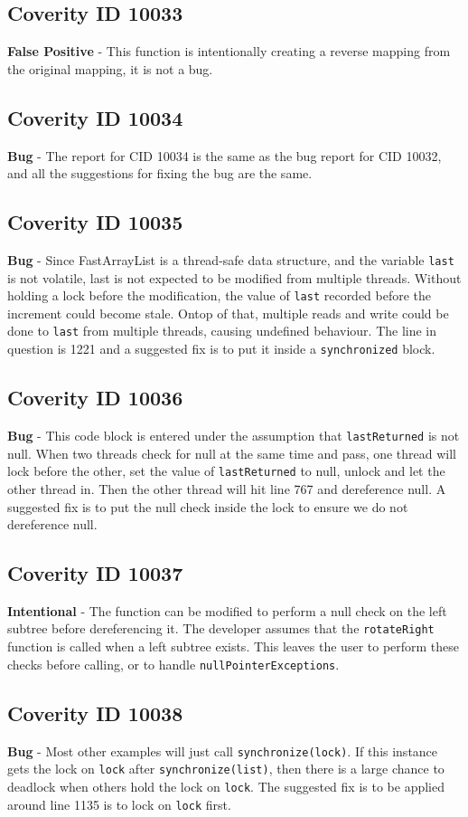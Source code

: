 \documentclass[12pt]{article}
\begin{document}
\subsection{Coverity ID 10033}
\textbf{False Positive} - This function is intentionally creating a reverse mapping from the original mapping, it is not a bug.
\subsection{Coverity ID 10034}
\textbf{Bug} - The report for CID 10034 is the same as the bug report for CID 10032, and all the suggestions for fixing the bug are the same.
\subsection{Coverity ID 10035}
\textbf{Bug} - Since FastArrayList is a thread-safe data structure, and the variable \texttt{last} is not volatile, last is not expected to be modified from multiple threads. Without holding a lock before the modification, the value of \texttt{last} recorded before the increment could become stale. Ontop of that, multiple reads and write could be done to \texttt{last} from multiple threads, causing undefined behaviour. The line in question is 1221 and a suggested fix is to put it inside a \texttt{synchronized} block.
\subsection{Coverity ID 10036}
\textbf{Bug} - This code block is entered under the assumption that \texttt{lastReturned} is not null. When two threads check for null at the same time and pass, one thread will lock before the other, set the value of \texttt{lastReturned} to null, unlock and let the other thread in. Then the other thread will hit line 767 and dereference null. A suggested fix is to put the null check inside the lock to ensure we do not dereference null.
\subsection{Coverity ID 10037}
\textbf{Intentional} - The function can be modified to perform a null check on the left subtree before dereferencing it. The developer assumes that the \texttt{rotateRight} function is called when a left subtree exists. This leaves the user to perform these checks before calling, or to handle \texttt{nullPointerExceptions}.
\subsection{Coverity ID 10038}
\textbf{Bug} - Most other examples will just call \texttt{synchronize(lock)}. If this instance gets the lock on \texttt{lock} after \texttt{synchronize(list)}, then there is a large chance to deadlock when others hold the lock on \texttt{lock}. The suggested fix is to be applied around line 1135 is to lock on \texttt{lock} first.
\end{document}
